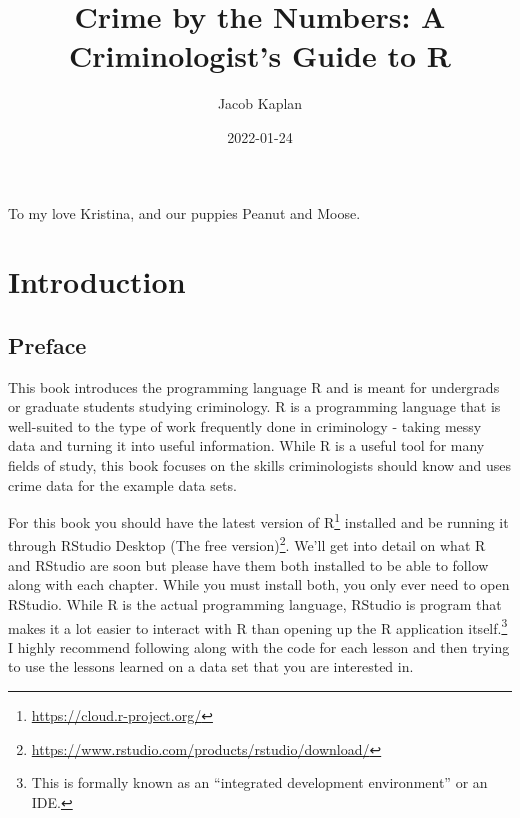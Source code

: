 \documentclass[
]{krantz}
\title{Crime by the Numbers: A Criminologist's Guide to R}
\author{Jacob Kaplan}
\date{2022-01-24}
\renewcommand{\href}[2]{#2\footnote{\url{#1}}}
\begin{document}
\maketitle

\thispagestyle{empty}
\begin{center}
To my love Kristina, and our puppies Peanut and Moose.
\end{center}

\setlength{\abovedisplayskip}{-5pt}
\setlength{\abovedisplayshortskip}{-5pt}

{
\hypersetup{linkcolor=}
\setcounter{tocdepth}{2}
\tableofcontents
}

\hypertarget{part-introduction}{%
\part{Introduction}\label{part-introduction}}

\hypertarget{preface}{%
\chapter*{Preface}\label{preface}}


This book introduces the programming language R and is meant
for undergrads or graduate students studying criminology. R
is a programming language that is well-suited to the type of
work frequently done in criminology - taking messy data and
turning it into useful information. While R is a useful tool
for many fields of study, this book focuses on the skills
criminologists should know and uses crime data for the
example data sets.

For this book you should have the latest version of
\href{https://cloud.r-project.org/}{R} installed and be
running it through
\href{https://www.rstudio.com/products/rstudio/download/}{RStudio
Desktop (The free version)}. We'll get into detail on what R
and RStudio are soon but please have them both installed to
be able to follow along with each chapter. While you must
install both, you only ever need to open RStudio. While R is
the actual programming language, RStudio is program that
makes it a lot easier to interact with R than opening up the
R application itself.\footnote{This is formally known as an
  ``integrated development environment'' or an IDE.} I
highly recommend following along with the code for each
lesson and then trying to use the lessons learned on a data
set that you are interested in.
\end{document}
